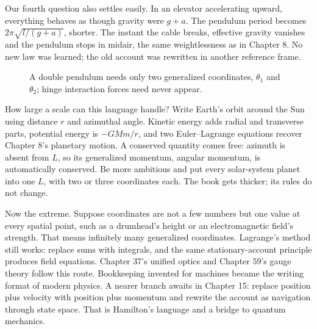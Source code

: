 \begin{mainline}
Our fourth question also settles easily. In an elevator accelerating upward, everything behaves as though gravity were \(g+a\). The pendulum period becomes \(2\pi\sqrt{l/(g+a)}\), shorter. The instant the cable breaks, effective gravity vanishes and the pendulum stops in midair, the same weightlessness as in Chapter 8. No new law was learned; the old account was rewritten in another reference frame.
\end{mainline}

\begin{figure}[htbp]
\centering
{}
\caption{A double pendulum needs only two generalized coordinates, \(\theta_1\) and \(\theta_2\); hinge interaction forces need never appear.}
\end{figure}


\begin{thought}
How large a scale can this language handle? Write Earth's orbit around the Sun using distance \(r\) and azimuthal angle. Kinetic energy adds radial and transverse parts, potential energy is \(-GMm/r\), and two Euler--Lagrange equations recover Chapter 8's planetary motion. A conserved quantity comes free: azimuth is absent from \(L\), so its generalized momentum, angular momentum, is automatically conserved. Be more ambitious and put every solar-system planet into one \(L\), with two or three coordinates each. The book gets thicker; its rules do not change.

Now the extreme. Suppose coordinates are not a few numbers but one value at every spatial point, such as a drumhead's height or an electromagnetic field's strength. That means infinitely many generalized coordinates. Lagrange's method still works: replace sums with integrals, and the same stationary-account principle produces field equations. Chapter 37's unified optics and Chapter 59's gauge theory follow this route. Bookkeeping invented for machines became the writing format of modern physics. A nearer branch awaits in Chapter 15: replace position plus velocity with position plus momentum and rewrite the account as navigation through state space. That is Hamilton's language and a bridge to quantum mechanics.
\end{thought}

